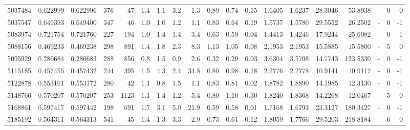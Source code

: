 \begin{tabular}{rrrrrrrrrrrrrrrrlrr}
   5037484 & 0.622999 &   0.622996 &  376 &   47 &      1.4 &      1.1 &     3.2 &      1.3 &       0.89 &        0.74 &        0.15 &  1.6405 &  1.6237 &   28.3046 &   53.8938 &             - &        0 &          0 \\
   5037547 & 0.649393 &   0.649400 &  347 &   46 &      1.0 &      1.0 &     1.2 &      1.1 &       0.83 &        0.64 &        0.19 &  1.5737 &  1.5780 &   29.5552 &   26.2502 &             - &        0 &         -1 \\
   5083974 & 0.721754 &   0.721760 &  227 &  194 &      1.0 &      1.4 &     1.4 &      3.4 &       0.63 &        0.59 &        0.04 &  1.4413 &  1.4246 &   17.9244 &   25.6082 &             - &        0 &         -1 \\
   5088156 & 0.469233 &   0.469238 &  298 &  891 &      1.4 &      1.8 &     2.3 &      8.3 &       1.13 &        1.05 &        0.08 &  2.1953 &  2.1953 &   15.5885 &   15.5800 &             - &        5 &          0 \\
   5095929 & 0.280684 &   0.280683 &  288 &  856 &      0.8 &      1.5 &     0.9 &      2.6 &       0.32 &        0.29 &        0.03 &  3.6304 &  3.5708 &   14.7743 &  123.5330 &             - &        0 &         -1 \\
   5115185 & 0.457455 &   0.457432 &  244 &  395 &      1.5 &      4.3 &     2.4 &     34.8 &       0.80 &        0.98 &        0.18 &  2.2776 &  2.2778 &   10.9141 &   10.9117 &             - &        0 &         -1 \\
   5122878 & 0.553161 &   0.553172 &  280 &   42 &      1.1 &      0.8 &     1.5 &      1.1 &       0.83 &        0.81 &        0.02 &  1.8782 &  1.8890 &   14.1985 &   12.3130 &             - &        0 &         -1 \\
   5148766 & 0.570207 &   0.570207 &  253 & 1123 &      1.1 &      1.4 &     1.2 &      5.4 &       0.80 &        1.10 &        0.30 &  1.8240 &  1.8368 &   14.2268 &   12.0467 &             - &        5 &          0 \\
   5168861 & 0.597417 &   0.597442 &  198 &  691 &      1.7 &      3.1 &     5.0 &     21.9 &       0.59 &        0.58 &        0.01 &  1.7168 &  1.6793 &   23.3127 &  180.3427 &             - &        0 &         -1 \\
   5185192 & 0.564311 &   0.564313 &  541 &   45 &      1.4 &      1.3 &     3.3 &      2.9 &       0.73 &        0.61 &        0.12 &  1.8059 &  1.7766 &   29.5203 &  218.8184 &             - &        6 &          0 \\

\end{tabular}
